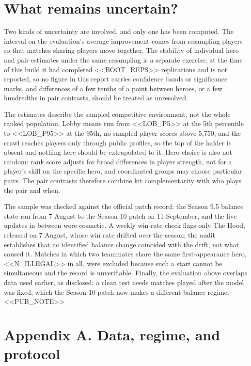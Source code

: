 \documentclass[11pt]{article}
\begin{document}
\section*{What remains uncertain?}

Two kinds of uncertainty are involved, and only one has been computed. The interval on the evaluation's
average improvement comes from resampling players so that matches sharing players move together. The
stability of individual hero and pair estimates under the same resampling is a separate exercise; at the
time of this build it had completed <<BOOT_REPS>> replications and is not reported, so no figure in this
report carries confidence bands or significance marks, and differences of a few tenths of a point between
heroes, or a few hundredths in pair contrasts, should be treated as unresolved.

The estimates describe the sampled competitive environment, not the whole ranked population. Lobby means
run from <<LOB_P5>> at the 5th percentile to <<LOB_P95>> at the 95th, no sampled player scores above
5{,}750, and the crawl reaches players only through public profiles, so the top of the ladder is absent
and nothing here should be extrapolated to it. Hero choice is also not random: rank score adjusts for broad
differences in player strength, not for a player's skill on the specific hero, and coordinated groups may
choose particular pairs. The pair contrasts therefore combine kit complementarity with who plays the pair
and when.

The sample was checked against the official patch record: the Season 9.5 balance state ran from 7 August to
the Season 10 patch on 11 September, and the five updates in between were cosmetic. A weekly win-rate
check flags only The Hood, released on 7 August, whose win rate drifted over the season; the audit
establishes that no identified balance change coincided with the drift, not what caused it. Matches in
which two teammates share the same first-appearance hero, <<N_ILLEGAL>> in all, were excluded because such
a start cannot be simultaneous and the record is unverifiable. Finally, the evaluation above overlaps
data used earlier, as disclosed; a clean test needs matches played after the model was fixed, which the
Season 10 patch now makes a different balance regime. <<PUB_NOTE>>

\FloatBarrier
\appendix
\FloatBarrier
\section*{Appendix A. Data, regime, and protocol}
\end{document}
